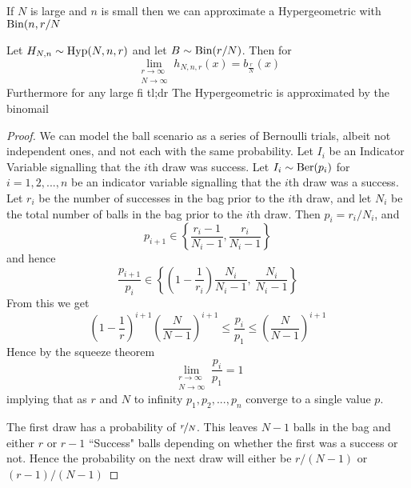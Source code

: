 \documentclass{report}
\begin{document}
\begin{lemma}
    If $N$ is large and $n$ is small then we can approximate a Hypergeometric with $\textup{Bin}(n,r/N$


    Let $H_{N,n}\sim\textup{Hyp}(N,n,r)$ and let $B\sim\textup{Bin}(r/N)$. Then for 
    \[
        \lim_{\substack{r\to\infty\\N\to\infty}} h_{N,n,r}(x)=b_{\frac r N}(x)
    \]
    Furthermore for any large fi
    \todo
    tl;dr The Hypergeometric is approximated by the binomail


    \begin{proof}


        We can model the ball scenario as a series of Bernoulli trials, albeit not independent ones, and not each with the same probability. Let $I_i$ be an Indicator Variable signalling that the $i$th draw was success. Let $I_i\sim\textup{Ber}(p_i)$ for $i=1,2,...,n$ be an indicator variable signalling that the $i$th draw was a success. Let $r_i$ be the number of successes in the bag prior to the $i$th draw, and let $N_i$ be the total number of balls in the bag prior to the $i$th draw. Then $p_i=r_i/N_i$, and 
        \[
            p_{i+1}\in\left\{\frac{r_i-1}{N_i-1}, \frac{r_i}{N_i-1}\right\}
        \]
        and hence
        \[
            \frac{p_{i+1}}{p_i}\in\left\{\left(1-\frac{1}{r_i}\right)\frac{N_i}{N_i-1},\ \frac{N_i}{N_i-1}\right\}
        \]
        From this we get
        \[
            \left(1-\frac{1}{r}\right)^{i+1}\left(\frac N {N-1}\right)^{i+1} \le \frac{p_i}{p_1}\le \left(\frac N {N-1}\right)^{i+1}
        \]
        Hence by the squeeze theorem 
        \[
            \lim_{\substack{r\to\infty\\N\to\infty}}\frac{p_i}{p_1}=1
        \]
        implying that as $r$ and $N$ to infinity $p_1,p_2,...,p_n$ converge to a single value $p$. 

        
        The first draw has a probability of $\nicefrac r N$. This leaves $N-1$ balls in the bag and either $r$ or $r-1$ ``Success" balls depending on whether the first was a success or not. Hence the probability on the next draw will either be $r/(N-1)$ or $(r-1)/(N-1)$
    \end{proof}
    
\end{lemma}
\end{document}
